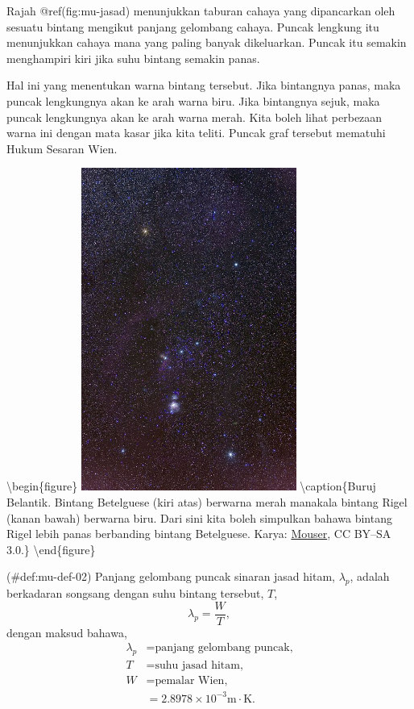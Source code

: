 \documentclass[
]{book}
\begin{document}
Rajah @ref(fig:mu-jasad) menunjukkan taburan cahaya yang dipancarkan
oleh sesuatu bintang mengikut panjang gelombang cahaya. Puncak lengkung
itu menunjukkan cahaya mana yang paling banyak dikeluarkan. Puncak itu
semakin menghampiri kiri jika suhu bintang semakin panas.

Hal ini yang menentukan warna bintang tersebut. Jika bintangnya panas,
maka puncak lengkungnya akan ke arah warna biru. Jika bintangnya sejuk,
maka puncak lengkungnya akan ke arah warna merah. Kita boleh lihat
perbezaan warna ini dengan mata kasar jika kita teliti. Puncak graf
tersebut mematuhi Hukum Sesaran Wien.

\textbackslash begin\{figure\}
\includegraphics[height=400px]{./gambar/ultra/belantik}
\textbackslash caption\{Buruj Belantik. Bintang Betelguese (kiri atas)
berwarna merah manakala bintang Rigel (kanan bawah) berwarna biru. Dari
sini kita boleh simpulkan bahawa bintang Rigel lebih panas berbanding
bintang Betelguese. Karya:
\href{https://commons.wikimedia.org/wiki/File:Orion_3008_huge.jpg}{Mouser},
CC BY--SA 3.0.\}\label{fig:mu-belantik} \textbackslash end\{figure\}

\BeginKnitrBlock{definition}{}

\protect\hypertarget{def:mu-def-02}{}{(\#def:mu-def-02) {} }Panjang gelombang puncak sinaran jasad hitam,
\(\lambda_p\), adalah berkadaran songsang dengan suhu bintang tersebut,
\(T\), \begin{equation}
    \lambda_p = \frac{W}{T},
\end{equation} dengan maksud bahawa, \begin{equation*}
\begin{split}
    \lambda_p & = \text{panjang gelombang puncak,} \\
    T & = \text{suhu jasad hitam,} \\
    W & = \text{pemalar Wien,} \\
    & = 2.8978\times 10^{-3}\text{m}\cdot\text{K}.\\
\end{split}
\end{equation*} 
\end{document}
